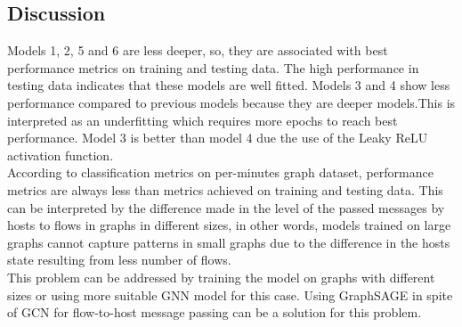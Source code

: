 \subsection{Discussion}
Models 1, 2, 5 and 6 are less deeper, so, they are associated with best performance metrics on training and testing data. The high performance in testing data indicates that these models are well fitted. Models 3 and 4 show less performance compared to previous models because they are deeper models.This is interpreted as an underfitting which requires more epochs to reach best performance. Model 3 is better than model 4  due the use of the Leaky ReLU activation function. \\
According to classification metrics on per-minutes graph dataset, performance metrics are always less than metrics achieved on training and testing data. This can be interpreted by the  difference made in the level of the passed messages by hosts to flows in graphs in different sizes, in other words, models trained on large graphs cannot capture patterns in small graphs due to the difference in the hosts state resulting from less number of flows.\\
This problem can be addressed by training the model on graphs with different sizes or using more suitable GNN model for this case. Using GraphSAGE in spite of GCN for flow-to-host message passing can be a solution for this problem.